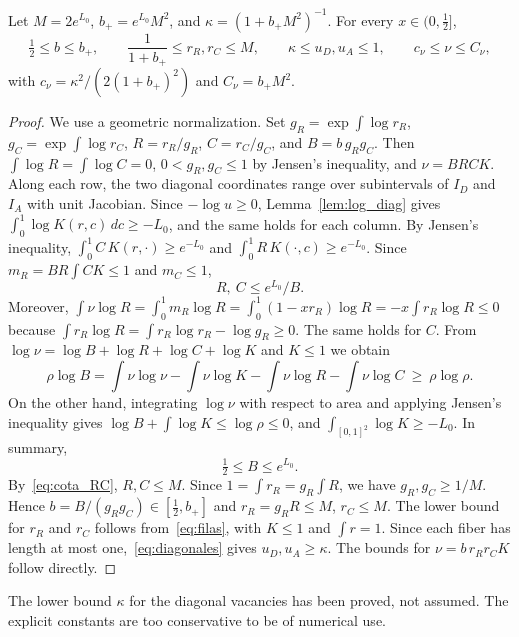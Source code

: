 \begin{proposicion}\label{prop:cotas} Let $M=2e^{L_0}$, $b_+=e^{L_0}M^2$, and $\kappa=(1+b_+M^2)^{-1}$. For every
$x\in(0,\frac12]$, \[
 \tfrac12\le b\le b_+,\qquad \frac1{1+b_+}\le r_R,r_C\le M,\qquad \kappa\le u_D,u_A\le1,\qquad
 c_\nu\le\nu\le C_\nu,
\] with $c_\nu=\kappa^2/(2(1+b_+)^2)$ and $C_\nu=b_+M^2$. \end{proposicion}

\begin{proof} We use a geometric normalization. Set $g_R=\exp\int\log r_R$, $g_C=\exp\int\log r_C$, $R=r_R/g_R$, $C=r_C/g_C$, and
$B=b\,g_Rg_C$. Then $\int\log R=\int\log C=0$, $0<g_R,g_C\le1$ by Jensen's inequality, and $\nu=BRCK$. Along each row, the two diagonal
coordinates range over subintervals of $I_D$ and $I_A$ with unit Jacobian. Since $-\log u\ge0$, Lemma~\ref{lem:log_diag} gives
$\int_0^1\log K(r,c)\,dc\ge-L_0$, and the same holds for each column. By Jensen's inequality, $\int_0^1C\,K(r,\cdot)\ge e^{-L_0}$ and
$\int_0^1R\,K(\cdot,c)\ge e^{-L_0}$. Since $m_R=BR\int CK\le1$ and $m_C\le1$, \begin{equation}\label{eq:cota_RC}
 R,\ C\le e^{L_0}/B .
\end{equation} Moreover, $\int\nu\log R=\int_0^1m_R\log R=\int_0^1(1-xr_R)\log R=-x\int r_R\log R\le0$ because $\int r_R\log R=\int
r_R\log r_R-\log g_R\ge0$. The same holds for $C$. From $\log\nu=\log B+\log R+\log C+\log K$ and $K\le1$ we obtain \[
 \rho\log B=\int\nu\log\nu-\int\nu\log K-\int\nu\log R-\int\nu\log C\ \ge\ \rho\log\rho .
\] On the other hand, integrating $\log\nu$ with respect to area and applying Jensen's inequality gives $\log B+\int\log
K\le\log\rho\le0$, and $\int_{[0,1]^2}\log K\ge-L_0$. In summary, \begin{equation}\label{eq:cota_B}
 \tfrac12\le B\le e^{L_0}.
\end{equation} By~\eqref{eq:cota_RC}, $R,C\le M$. Since $1=\int r_R=g_R\int R$, we have $g_R,g_C\ge1/M$. Hence
$b=B/(g_Rg_C)\in[\frac12,b_+]$ and $r_R=g_RR\le M$, $r_C\le M$. The lower bound for $r_R$ and $r_C$ follows from~\eqref{eq:filas}, with
$K\le1$ and $\int r=1$. Since each fiber has length at most one,~\eqref{eq:diagonales} gives $u_D,u_A\ge\kappa$. The bounds for
$\nu=b\,r_Rr_CK$ follow directly. \end{proof}

The lower bound $\kappa$ for the diagonal vacancies has been proved, not assumed. The explicit constants are too conservative to be of numerical use.
